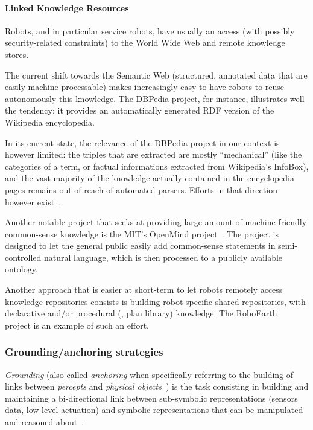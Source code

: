 \paragraph{Linked Knowledge Resources}
\label{sect|lod}

Robots, and in particular service robots, have usually an access (with possibly
security-related constraints) to the World Wide Web and remote knowledge stores.

The current shift towards the Semantic Web (\ie structured, annotated data that
are easily machine-processable) makes increasingly easy to have robots to reuse
autonomously this knowledge. The DBPedia project, for instance, illustrates
well the tendency: it provides an automatically generated RDF version of the
Wikipedia encyclopedia.

In its current state, the relevance of the DBPedia project in our context is
however limited: the triples that are extracted are mostly ``mechanical'' (like
the categories of a term, or factual informations extracted from Wikipedia's
InfoBox), and the vast majority of the knowledge actually contained in the
encyclopedia pages remains out of reach of automated parsers. Efforts in that
direction however exist~\cite{Nyga2009, Fader2011}.

Another notable project that seeks at providing large amount of
machine-friendly common-sense knowledge is the MIT's OpenMind
project~\cite{Singh2002}. The project is designed to let the general public
easily add common-sense statements in semi-controlled natural language, which is
then processed to a publicly available ontology.

Another approach that is easier at short-term to let robots remotely access
knowledge repositories consists is building robot-specific shared repositories,
with declarative and/or procedural (\ie, plan library) knowledge. The
RoboEarth~\cite{Waibel2011} project is an example of such an effort.

\subsubsection{Grounding/anchoring strategies}
\label{sect|grounding}

\emph{Grounding} (also called \emph{anchoring} when specifically referring to the
building of links between \emph{percepts} and \emph{physical
objects}~\cite{Coradeschi2003}) is the task consisting in building and
maintaining a bi-directional link between sub-symbolic representations (sensors
data, low-level actuation) and symbolic representations that can be
manipulated and reasoned about~\cite{Harnad1990}.

